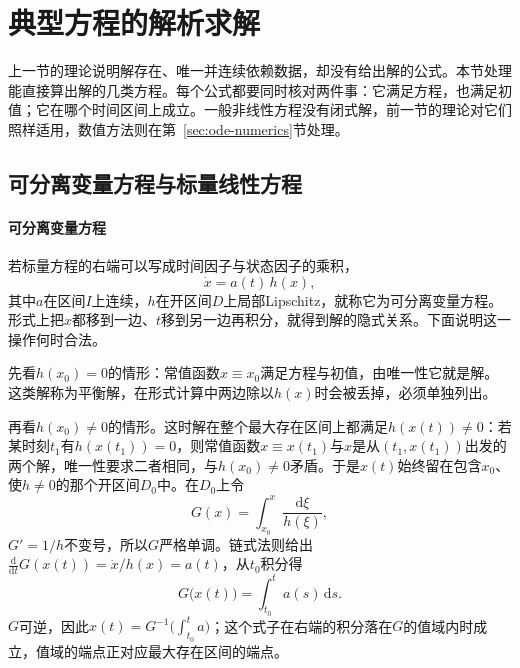 
\section{典型方程的解析求解}
\label{sec:ode-analytic-solutions}

上一节的理论说明解存在、唯一并连续依赖数据，却没有给出解的公式。本节处理能直接算出解的几类方程。每个公式都要同时核对两件事：它满足方程，也满足初值；它在哪个时间区间上成立。一般非线性方程没有闭式解，前一节的理论对它们照样适用，数值方法则在第~\ref{sec:ode-numerics}节处理。

\subsection{可分离变量方程与标量线性方程}
\label{sec:ode-separable-linear}

\paragraph{可分离变量方程}
若标量方程的右端可以写成时间因子与状态因子的乘积，
\begin{equation}
  \dot x=a(t)\,h(x),
  \label{eq:ode-separable}
\end{equation}
其中$a$在区间$I$上连续，$h$在开区间$D$上局部Lipschitz，就称它为可分离变量方程。形式上把$x$都移到一边、$t$移到另一边再积分，就得到解的隐式关系。下面说明这一操作何时合法。

先看$h(x_0)=0$的情形：常值函数$x\equiv x_0$满足方程与初值，由唯一性它就是解。这类解称为平衡解，在形式计算中两边除以$h(x)$时会被丢掉，必须单独列出。

再看$h(x_0)\neq0$的情形。这时解在整个最大存在区间上都满足$h(x(t))\neq0$：若某时刻$t_1$有$h(x(t_1))=0$，则常值函数$x\equiv x(t_1)$与$x$是从$(t_1,x(t_1))$出发的两个解，唯一性要求二者相同，与$h(x_0)\neq0$矛盾。于是$x(t)$始终留在包含$x_0$、使$h\neq0$的那个开区间$D_0$中。在$D_0$上令
\[
  G(x)=\int_{x_0}^x\frac{\mathrm d\xi}{h(\xi)},
\]
$G'=1/h$不变号，所以$G$严格单调。链式法则给出$\frac{\mathrm d}{\mathrm dt}G(x(t))=\dot x/h(x)=a(t)$，从$t_0$积分得
\begin{equation}
  G\bigl(x(t)\bigr)=\int_{t_0}^ta(s)\,\mathrm ds.
  \label{eq:ode-separable-implicit}
\end{equation}
$G$可逆，因此$x(t)=G^{-1}\bigl(\int_{t_0}^ta\bigr)$；这个式子在右端的积分落在$G$的值域内时成立，值域的端点正对应最大存在区间的端点。

